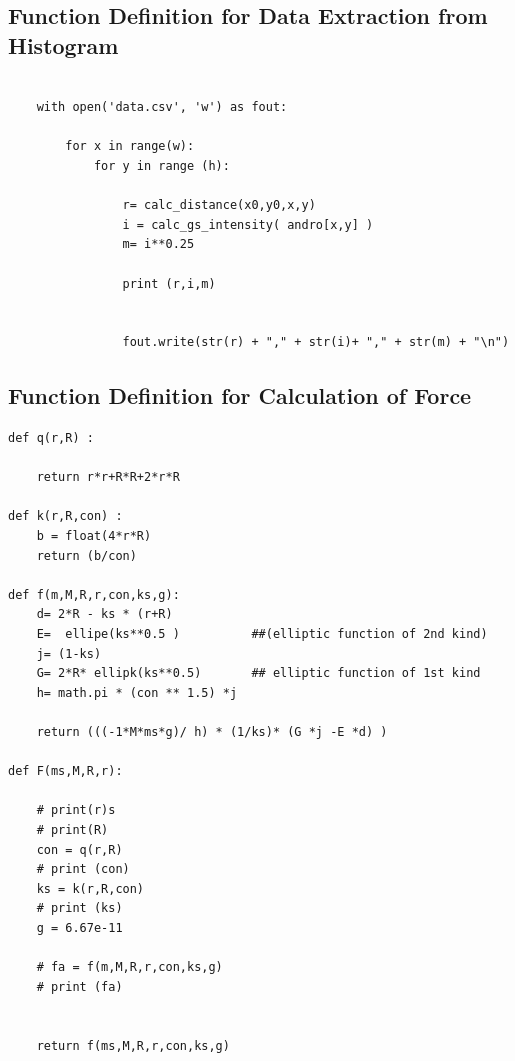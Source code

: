 \subsection{Function Definition for Data Extraction from Histogram}
\begin{verbatim}

    with open('data.csv', 'w') as fout:

        for x in range(w):
            for y in range (h):

                r= calc_distance(x0,y0,x,y)
                i = calc_gs_intensity( andro[x,y] )
                m= i**0.25 

                print (r,i,m)


                fout.write(str(r) + "," + str(i)+ "," + str(m) + "\n")

\end{verbatim}


\subsection{Function Definition for Calculation of Force}
\begin{verbatim}
def q(r,R) :

    return r*r+R*R+2*r*R

def k(r,R,con) :
    b = float(4*r*R)
    return (b/con)

def f(m,M,R,r,con,ks,g):
    d= 2*R - ks * (r+R)
    E=  ellipe(ks**0.5 )          ##(elliptic function of 2nd kind)
    j= (1-ks)
    G= 2*R* ellipk(ks**0.5)       ## elliptic function of 1st kind
    h= math.pi * (con ** 1.5) *j

    return (((-1*M*ms*g)/ h) * (1/ks)* (G *j -E *d) )

def F(ms,M,R,r):

    # print(r)s
    # print(R)
    con = q(r,R)
    # print (con)
    ks = k(r,R,con)
    # print (ks)
    g = 6.67e-11

    # fa = f(m,M,R,r,con,ks,g)
    # print (fa)


    return f(ms,M,R,r,con,ks,g)

\end{verbatim}

